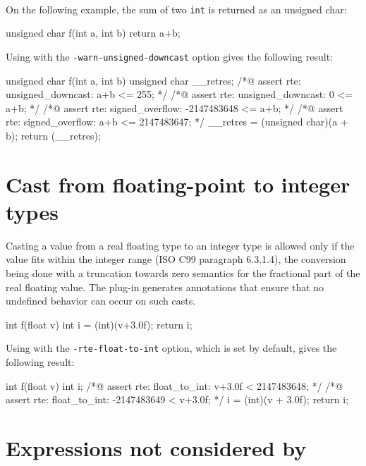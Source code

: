 \begin{example} ~

On the following example, the sum of two \lstinline|int| is returned as an
unsigned char:

\begin{listing-nonumber}
unsigned char f(int a, int b) {
  return a+b;
}
\end{listing-nonumber}

Using \rte{} with the \lstinline|-warn-unsigned-downcast| option gives the
following result:
\begin{listing-nonumber}
unsigned char f(int a, int b) {
  unsigned char __retres;
  /*@ assert rte: unsigned_downcast: a+b <= 255; */
  /*@ assert rte: unsigned_downcast: 0 <= a+b; */
  /*@ assert rte: signed_overflow: -2147483648 <= a+b; */
  /*@ assert rte: signed_overflow: a+b <= 2147483647; */
  __retres = (unsigned char)(a + b);
  return (__retres);
}
\end{listing-nonumber}


\end{example}

\section{Cast from floating-point to integer types}

Casting a value from a real floating type to an integer type is
allowed only if the value fits within the integer range (ISO C99
paragraph \mbox{6.3.1.4}), the conversion being done with a truncation
towards zero semantics for the fractional part of the real floating
value.  The \rte{} plug-in generates annotations that ensure that no
undefined behavior can occur on such casts.

\begin{listing-nonumber}
int f(float v) {
  int i = (int)(v+3.0f);
  return i;
}
\end{listing-nonumber}

Using \rte{} with the \lstinline|-rte-float-to-int| option, which is set
by default, gives the following result:
\begin{listing-nonumber}
int f(float v) {
  int i;
  /*@ assert rte: float_to_int: v+3.0f < 2147483648; */
  /*@ assert rte: float_to_int: -2147483649 < v+3.0f; */
  i = (int)(v + 3.0f);
  return i;
}
\end{listing-nonumber}


\section{Expressions not considered by \rte{}}

